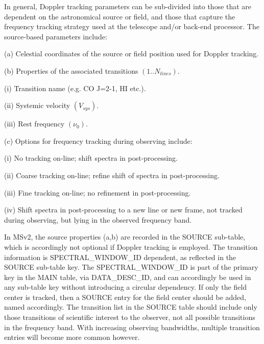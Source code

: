 \documentclass{article}
\begin{document}
In general, Doppler tracking parameters can be sub-divided into those
that are dependent on the astronomical source or field, and those that
capture the frequency tracking strategy used at the telescope and/or
back-end processor. The source-based parameters include:

\begin{description}

\item{(a) Celestial coordinates of the source or field position used
for Doppler tracking.}

\item{(b) Properties of the associated transitions $(1..N_{lines})$.
   \begin{description}
      \item{(i) Transition name (e.g. CO J=2-1, HI etc.).}
      \item{(ii) Systemic velocity $(V_{sys}).$}
      \item{(iii) Rest frequency $(\nu_0).$}
   \end{description}}

\item{(c) Options for frequency tracking during observing include:
   \begin{description}
      \item{(i) No tracking on-line; shift spectra in post-processing.}
      \item{(ii) Coarse tracking on-line; refine shift of spectra in post-processing.}
      \item{(iii) Fine tracking on-line; no refinement in post-processing.}
      \item{(iv) Shift spectra in post-processing to a new line or new frame, not tracked during observing, but lying in the observed frequency band.}
   \end{description}}
\end{description}

In MSv2, the source properties (a,b) are recorded in the SOURCE
sub-table, which is accordingly not optional if Doppler tracking is
employed. The transition information is SPECTRAL\_WINDOW\_ID dependent, as
reflected in the SOURCE sub-table key. The SPECTRAL\_WINDOW\_ID is part of the
primary key in the MAIN table, via DATA\_DESC\_ID, and can accordingly
be used in any sub-table key without introducing a circular
dependency. If only the field center is tracked, then a SOURCE entry
for the field center should be added, named accordingly. The
transition list in the SOURCE table should include only those
transitions of scientific interest to the observer, not all possible
transitions in the frequency band. With increasing observing
bandwidths, multiple transition entries will become more common
however.
\end{document}
